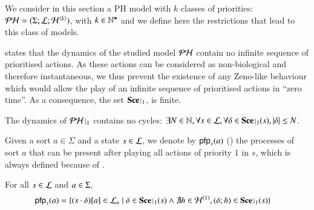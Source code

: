 We consider in this section a PH model with $k$ classes of priorities: $\mathcal{PH} = (\Sigma; \mathcal{L}; \mathcal{H}^{\langle k \rangle})$, with $k \in \mathbb{N}^\bullet$
and we define here the restrictions that lead to this class of models.

 states that the dynamics of the studied model $\mathcal{PH}$ contain no infinite sequence of prioritised actions.
As these actions can be considered as non-biological and therefore instantaneous, we thus prevent the existence of any Zeno-like behaviour
which would allow the play of an infinite sequence of prioritised actions in “zero time”.
As a consequence, the set $\restriction{\Sce}{1}$,
is finite.

\begin{condition}
\label{cr:bounded}
  The dynamics of $\restriction{\PH}{1}$ contains no cycles:
  $\exists N \in \sN, \forall s \in \PHl, \forall \delta \in \restriction{\Sce}{1}(s), |\delta| \leq N$.
\end{condition}

%

Given a sort $a\in\Sigma$ and a state $s\in \mathcal{L}$, 
we denote by $\mathsf{pfp}_s(a)$ () the processes of sort $a$ that can be present after
playing all actions of priority $1$ in $s$,
which is always defined because of .
%

\begin{definition}[$\pfp : \PHl \times \PHs \rightarrow \powerset(\PHproc)$]
\label{def:pfp}
  For all $s \in \mathcal{L}$ and $a \in \Sigma$,
  \begin{align*}
    \pfp_s(a) = \{ \get{(s\play\delta)}{a} \in \PHl_a &\mid \delta \in \restriction{\Sce}{1}(s)
					\wedge\nexists h\in\PHh^{(1)}, (\delta; h) \in\restriction{\Sce}{1}(s) \}
  \end{align*}
\end{definition}

%

